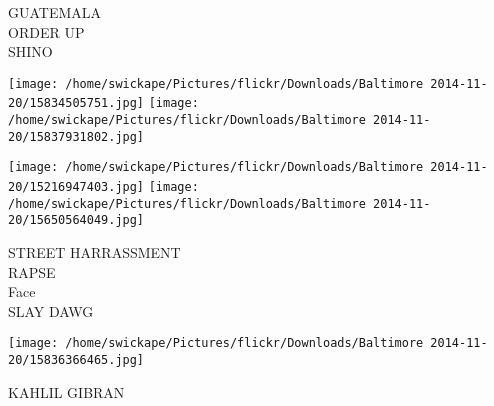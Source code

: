 \documentclass[10pt,letterpaper]{article}
\begin{document}
GUATEMALA\\
ORDER UP\\
SHINO\\
\pagebreak

\texttt{[image: /home/swickape/Pictures/flickr/Downloads/Baltimore 2014-11-20/15834505751.jpg]}
\texttt{[image: /home/swickape/Pictures/flickr/Downloads/Baltimore 2014-11-20/15837931802.jpg]}

\texttt{[image: /home/swickape/Pictures/flickr/Downloads/Baltimore 2014-11-20/15216947403.jpg]}
\texttt{[image: /home/swickape/Pictures/flickr/Downloads/Baltimore 2014-11-20/15650564049.jpg]}

STREET HARRASSMENT\\
RAPSE\\
Face\\
SLAY DAWG\\
\pagebreak

\texttt{[image: /home/swickape/Pictures/flickr/Downloads/Baltimore 2014-11-20/15836366465.jpg]}

KAHLIL GIBRAN\\
\pagebreak
\end{document}
